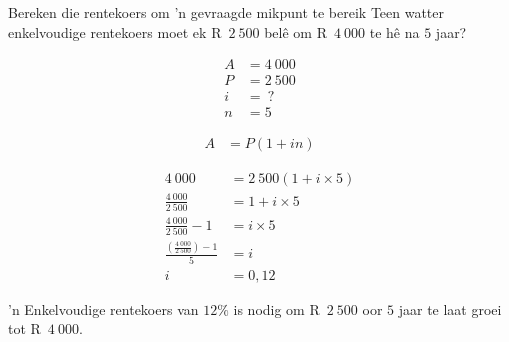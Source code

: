 \begin{wex}{Bereken die rentekoers om 'n gevraagde mikpunt te bereik}{
    Teen watter enkelvoudige rentekoers moet ek R~$2~500$ bel\^e om R~$4~000$ te h\^e na $5$ jaar?}{

    \begin{align*}
	A &= 4~000\\
	P &= 2~500\\
	i &= ~?\\
	n &= 5
    \end{align*}

    \begin{align*}
	A &= P(1 + in)
    \end{align*}

    \begin{align*}
	4~000 &= 2~500(1 + i \times 5)\\
	\frac{4~000}{2~500} &= 1 + i \times 5\\
	\frac{4~000}{2~500} - 1&= i \times 5\\
	\frac{(\frac{4~000}{2~500}) - 1}{5} &= i\\
	i &= 0,12
    \end{align*}

    'n Enkelvoudige rentekoers van $12\%$ is nodig om R~$2~500$ oor $5$ jaar te laat groei tot R~$4~000$.
    }
\end{wex}

% 
% 
% 


